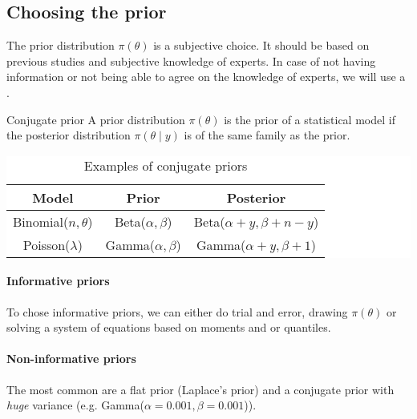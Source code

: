 \subsection{Choosing the prior}

The prior distribution $\pi(\theta)$ is a subjective choice. It should be based on previous
studies and subjective knowledge of experts. In case of not having information or
not being able to agree on the knowledge of experts, we will use a .

\begin{definition}{Conjugate prior}{}
	A prior distribution $\pi(\theta)$ is the  prior of a statistical model
	if the posterior distribution $\pi(\theta \mid y)$ is of the same family as the prior.

	\begin{table}[H]
		\caption{Examples of conjugate priors}
		\colorbox{white}{%
			\begin{tabular}{ccc}
				\toprule
				Model                & Prior                 & Posterior                        \\
				\midrule
				Binomial($n,\theta$) & Beta($\alpha,\beta$)  & Beta($\alpha + y,\beta + n - y$) \\
				Poisson($\lambda$)   & Gamma($\alpha,\beta$) & Gamma($\alpha + y,\beta + 1$)    \\
				\bottomrule
			\end{tabular}%
		}
	\end{table}

\end{definition}

\paragraph{Informative priors}
To chose informative priors, we can either do trial and error, drawing
$\pi(\theta)$ or solving a system of equations based on moments and or quantiles.

\paragraph{Non-informative priors}
The most common are a flat prior (Laplace's prior) and a conjugate prior with
\emph{huge} variance (e.g. Gamma($\alpha=0.001,\beta=0.001$)).
